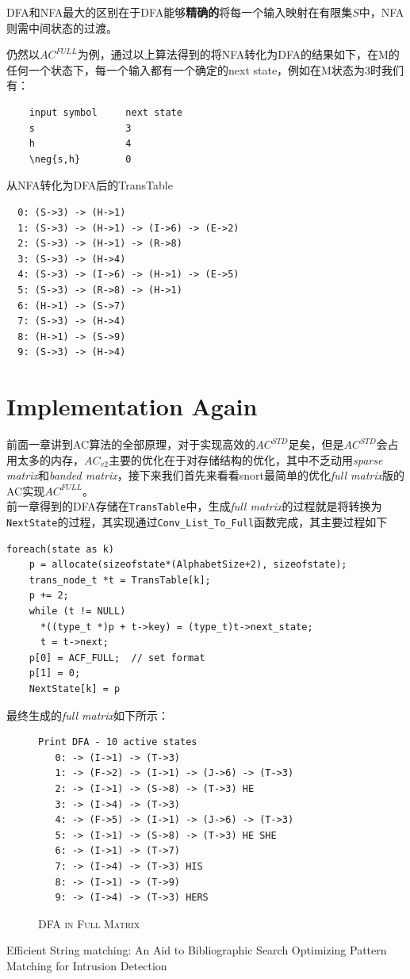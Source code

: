 \documentclass{article}
\begin{document}
DFA和NFA最大的区别在于DFA能够\textbf{精确的}将每一个输入映射在有限集$S$中，NFA则需中间状态的过渡。

仍然以$AC^{FULL}$为例，通过以上算法得到的将NFA转化为DFA的结果如下，在M的任何一个状态下，每一个输入都有一个确定的next state，例如在M状态为3时我们有：
\begin{verbatim}
    input symbol     next state
    s                3
    h                4
    \neg{s,h}        0
\end{verbatim}
从NFA转化为DFA后的TransTable
\begin{verbatim}
  0: (S->3) -> (H->1)
  1: (S->3) -> (H->1) -> (I->6) -> (E->2)
  2: (S->3) -> (H->1) -> (R->8)
  3: (S->3) -> (H->4)
  4: (S->3) -> (I->6) -> (H->1) -> (E->5)
  5: (S->3) -> (R->8) -> (H->1)
  6: (H->1) -> (S->7)
  7: (S->3) -> (H->4)
  8: (H->1) -> (S->9)
  9: (S->3) -> (H->4)
\end{verbatim}


\section{Implementation Again}
前面一章讲到AC算法的全部原理，对于实现高效的$AC^{STD}$足矣，但是$AC^{STD}$会占用太多的内存，$AC_{v2}$主要的优化在于对存储结构的优化，其中不乏动用\textit{sparse matrix}和\textit{banded matrix}，接下来我们首先来看看snort最简单的优化\textit{full matrix}版的AC实现$AC^{FULL}$。\\
前一章得到的DFA存储在\lstinline|TransTable|中，生成\textit{full matrix}的过程就是将转换为\lstinline|NextState|的过程，其实现通过\lstinline|Conv_List_To_Full|函数完成，其主要过程如下
\begin{lstlisting}
foreach(state as k)
    p = allocate(sizeofstate*(AlphabetSize+2), sizeofstate);
    trans_node_t *t = TransTable[k];
    p += 2;
    while (t != NULL)
      *((type_t *)p + t->key) = (type_t)t->next_state;
      t = t->next;
    p[0] = ACF_FULL;  // set format
    p[1] = 0;
    NextState[k] = p
\end{lstlisting}

最终生成的\textit{full matrix}如下所示：
\begin{figure}[h]
  \centering
\caption{\textsc{DFA in Full Matrix}}
\begin{verbatim}
Print DFA - 10 active states
   0: -> (I->1) -> (T->3)
   1: -> (F->2) -> (I->1) -> (J->6) -> (T->3)
   2: -> (I->1) -> (S->8) -> (T->3) HE
   3: -> (I->4) -> (T->3)
   4: -> (F->5) -> (I->1) -> (J->6) -> (T->3)
   5: -> (I->1) -> (S->8) -> (T->3) HE SHE
   6: -> (I->1) -> (T->7)
   7: -> (I->4) -> (T->3) HIS
   8: -> (I->1) -> (T->9)
   9: -> (I->4) -> (T->3) HERS
\end{verbatim}
\end{figure}


\begin{thebibliography}{99}
 Efficient String matching: An Aid to Bibliographic Search
 Optimizing Pattern Matching for Intrusion Detection
\end{thebibliography}
\end{document}
